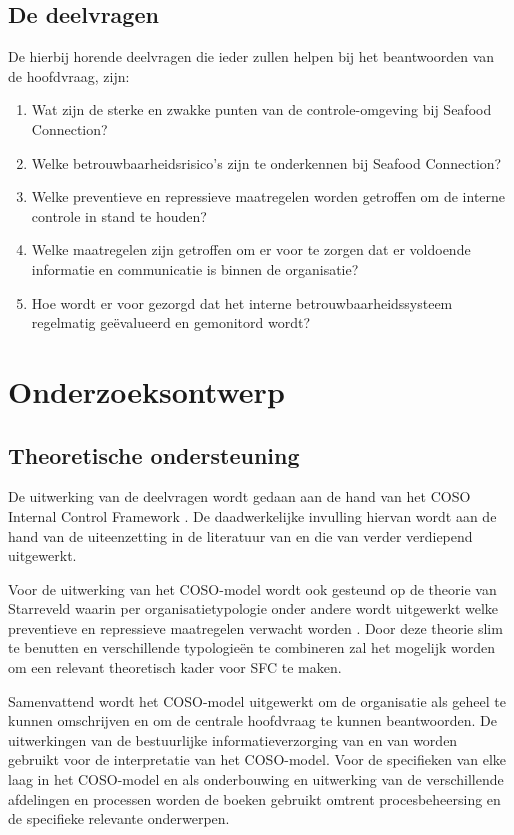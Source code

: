 \documentclass[10pt,a4paper,twoside]{report}
\begin{document}
    \section{De deelvragen}
De hierbij horende deelvragen die ieder zullen helpen bij het beantwoorden van de hoofdvraag, zijn:

\begin{enumerate}
    \item Wat zijn de sterke en zwakke punten van de controle-omgeving bij Seafood Connection?
    \item Welke betrouwbaarheidsrisico's zijn te onderkennen bij Seafood Connection?
    \item Welke preventieve en repressieve maatregelen worden getroffen om de interne controle in stand te houden?
    \item Welke maatregelen zijn getroffen om er voor te zorgen dat er voldoende informatie en communicatie is binnen de organisatie?
    \item Hoe wordt er voor gezorgd dat het interne betrouwbaarheidssysteem regelmatig geëvalueerd en gemonitord wordt?
\end{enumerate}


\chapter{Onderzoeksontwerp}

\section{Theoretische ondersteuning}
De uitwerking van de deelvragen wordt gedaan aan de hand van het COSO Internal Control Framework \citep{COSOsummery}. De daadwerkelijke invulling hiervan wordt aan de hand van de uiteenzetting in de literatuur van \citet{bivpraktijk} en die van \citet{bivperspectief} verder verdiepend uitgewerkt. 

Voor de uitwerking van het COSO-model wordt ook gesteund op de theorie van Starreveld waarin per organisatietypologie onder andere wordt uitgewerkt welke preventieve en repressieve maatregelen verwacht worden \citep{jans,financiering,buunk}. Door deze theorie slim te benutten en verschillende typologieën te combineren zal het mogelijk worden om een relevant theoretisch kader voor SFC te maken. 

Samenvattend wordt het COSO-model uitgewerkt om de organisatie als geheel te kunnen omschrijven en om de centrale hoofdvraag te kunnen beantwoorden. De uitwerkingen van de bestuurlijke informatieverzorging van \citet{bivperspectief} en van \citet{bivpraktijk} worden gebruikt voor de interpretatie van het COSO-model. Voor de specifieken van elke laag in het COSO-model en als onderbouwing en uitwerking van de verschillende afdelingen en processen worden de boeken gebruikt omtrent procesbeheersing en de specifieke relevante onderwerpen. \citep{internebeheersing,jans,financiering,buunk}
\end{document}
